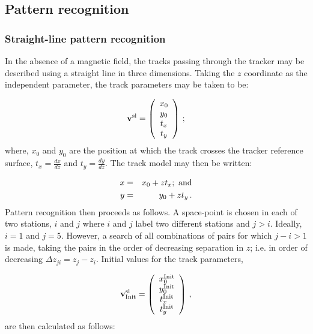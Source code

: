 \subsection{Pattern recognition}
\label{Sect:PatRec}

\subsubsection{Straight-line pattern recognition}
\label{SubSect:SLPatRec}

In the absence of a magnetic field, the tracks passing through the tracker may be described using a straight line in three dimensions. Taking the $z$ coordinate as the independent parameter, the track parameters may be taken to be:

\begin{equation}
 {\bf v^{\rm sl}} =
 \left( 
   \begin{array}{c}
     x_0 \\
     y_0 \\
     t_x \\
     t_y
   \end{array}
 \right)\,;
\end{equation}
where, $x_0$ and $y_0$ are the position at which the track crosses the tracker reference surface, $t_x = \frac{dx}{dz}$ and $t_y = \frac{dy}{dz}$. The track model may then be written:

\begin{eqnarray}
  x & = & x_0 + z t_x {\rm;~and} \\
  y & = & y_0 + z t_y \,.
\end{eqnarray}
Pattern recognition then proceeds as follows. A space-point is chosen in each of two stations, $i$ and $j$ where $i$ and $j$ label two different stations and $j>i$. Ideally, $i=1$ and $j=5$. However, a search of all combinations of pairs for which $j-i>1$ is made, taking the pairs in the order of decreasing separation in $z$; i.e. in order of decreasing $\Delta z_{ji} = z_j - z_i$. Initial values for the track parameters,

\begin{equation}
 {\bf v^{\rm sl}_{\rm Init}} =
 \left( 
   \begin{array}{c}
     x_0^{\rm Init} \\
     y_0^{\rm Init} \\
     t_x^{\rm Init} \\
     t_y^{\rm Init}
   \end{array}
 \right)\,,
\end{equation}
are then calculated as follows:

